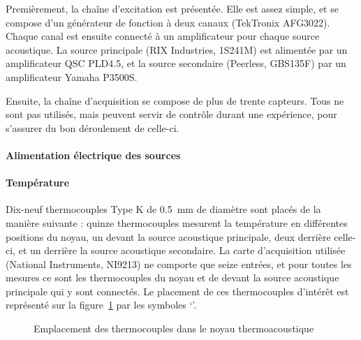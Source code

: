 Premièrement, la chaîne d'excitation est présentée. Elle est assez simple, et se compose d'un générateur de fonction à deux canaux (TekTronix AFG3022). Chaque canal est ensuite connecté à un amplificateur pour chaque source acoustique. La source principale (RIX Industries, 1S241M) est alimentée par un amplificateur QSC PLD4.5, et la source secondaire (Peerless, GBS135F) par un amplificateur Yamaha P3500S.\medskip


Ensuite, la chaîne d'acquisition se compose de plus de trente capteurs. Tous ne sont pas utilisés, mais peuvent servir de contrôle durant une expérience, pour s'assurer du bon déroulement de celle-ci.

\paragraph*{Alimentation électrique des sources}

\paragraph*{Température} Dix-neuf thermocouples Type K de \qty{.5}{\milli\meter} de diamètre sont placés de la manière suivante : quinze thermocouples mesurent la température en différentes positions du noyau, un devant la source acoustique principale, deux derrière celle-ci, et un derrière la source acoustique secondaire. La carte d'acquisition utilisée (National Instruments, NI9213) ne comporte que seize entrées, et pour toutes les mesures ce sont les thermocouples du noyau et de devant la source acoustique principale qui y sont connectés. Le placement de ces thermocouples d'intérêt est représenté sur la figure~\ref{fig:TCdansNoyau} par les symboles `\textcolor{cyan}{\textbullet}'.

\begin{figure}[!ht]
    \centering
    
    \caption{Emplacement des thermocouples dans le noyau thermoacoustique}
    \label{fig:TCdansNoyau}
\end{figure}

